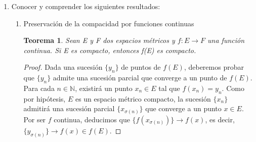 \documentclass[a4paper, 12pt]{article}
\newtheorem{teorema}{Teorema}
\begin{document}
\begin{enumerate}[label=\textbf{\arabic*}.]
\begin{enumerate}[label=\textit{\alph*})]
	Resaltemos que la conexión es una propiedad topológica, se expresa usando sólo conjuntos abiertos y se puede definir de la misma forma para espacios topológicos cualesquiera. 
	
		\begin{itemize}
		\item \textit{Para un espacio métrico E, las siguientes afirmaciones son equivalentes:}
			\begin{enumerate}[label=(\textit{\roman*})]
			\item \textit{E es conexo}.
			\item \textit{La imagen de toda función continua de E en \(\mathbb{R}\) es un intervalo.}
			\item \textit{Toda función continua de E en \(\{0,1\}\) es constante}.
			\end{enumerate}
		\end{itemize}
		
		Por el teorema del valor intermedio, todo intervalo es un subconjunto conexo de \(\mathbb{R}\), puesto que verfica la afirmación \textit{(ii)} anterior. Recíprocamente, si \(A\) es un subconjunto conexo de \(\mathbb{R}\), como la inclusión \(I: A \rightarrow \mathbb{R}\), definida por \(I(x) = x\) para todo \(x \in A\), es continua, deducimos que \(I(A) = A\) es un intervalo. Tenemos así una caracterización \textit{topológica} de los intervalos:
	
	\begin{itemize}
		\item \textit{Un subconjunto de \(\mathbb{R}\) es conexo si, y sólo si, es un intervalo.}
	\end{itemize}
	\end{enumerate}
	
	
	
\bigskip

	\item Conocer y comprender los siguientes resultados:
	
	\begin{enumerate}[label=\textit{\alph*})]
		\item Preservación de la compacidad por funciones continuas
		
		\begin{teorema}
			Sean E y F dos espacios métricos y \(f: E \rightarrow F\) una función continua. Si E es compacto, entonces f(E) es compacto.
		\end{teorema}
		
		\begin{proof}
			Dada una sucesión \(\{y_n\}\) de puntos de \(f(E)\), deberemos probar que \(\{y_n\}\) admite una sucesión parcial que converge a un punto de \(f(E)\). Para cada \(n \in \mathbb{N}\), existirá un punto \(x_n \in E\) tal que \(f(x_n) = y_n\). Como por hipótesis, \(E\) es un espacio métrico compacto, la sucesión \(\{x_n\}\) admitirá una sucesión parcial \(\{x_{\sigma (n)}\}\) que converge a un punto \(x \in E\). Por ser \(f\) continua, deducimos que \(\{f(x_{\sigma (n)})\} \rightarrow f(x)\), es decir, \(\{y_{\sigma (n)}\} \rightarrow f(x) \in f(E)\).
		\end{proof}
		

\end{enumerate}
\end{enumerate}
\end{document}
